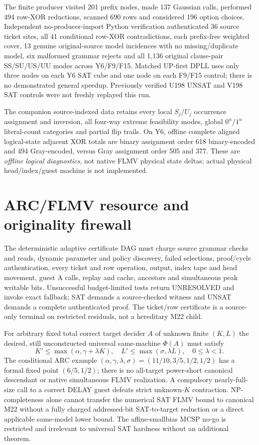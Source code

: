 \documentclass[11pt]{article}
\begin{document}
The finite producer visited 201 prefix nodes, made 137 Gaussian calls, performed 494 row-XOR reductions, scanned 690 rows and considered 196 option choices. Independent no-producer-import Python verification authenticated 36 source ticket sites, all 41 conditional row-XOR contradictions, each prefix-free weighted cover, 13 genuine original-source model incidences with no missing/duplicate model, six malformed grammar rejects and all 1,136 original clause-pair SS/SU/US/UU modes across Y6/F9/F15. Matched UP-first DPLL uses only three nodes on each Y6 SAT cube and one node on each F9/F15 control; there is no demonstrated general speedup. Previously verified U198 UNSAT and V198 SAT controls were not freshly replayed this run.

The companion source-indexed data retains every local $S_j/U_j$ occurrence assignment and inversion, all four-way extreme feasibility modes, global $0^n/1^n$ literal-count categories and partial flip trails. On Y6, offline complete aligned logical-state adjacent XOR totals are binary assignment order 618 binary-encoded and 494 Gray-encoded, versus Gray assignment order 505 and 377. These are \emph{offline logical diagnostics}, not native FLMV physical state deltas; actual physical head/index/guest machine is not implemented.

\section{ARC/FLMV resource and originality firewall}
The deterministic adaptive certificate DAG must charge source grammar checks and reads, dynamic parameter and policy discovery, failed selections, proof/cycle authentication, every ticket and row operation, output, index tape and head movement, guest A calls, replay and cache, ancestors and simultaneous peak writable bits. Unsuccessful budget-limited tests return UNRESOLVED and invoke exact fallback; SAT demands a source-checked witness and UNSAT demands a complete authenticated proof. The ticket/row certificate is a source-only terminal on restricted residuals, not a hereditary M22 child.

For arbitrary fixed total correct target decider $A$ of unknown finite $(K,L)$ the desired, still unconstructed universal same-machine $\Phi(A)$ must satisfy
\[
K'\le\max(\alpha,\gamma+\lambda K),\quad
L'\le\max(\sigma,\lambda L),\quad 0\le\lambda<1.
\]
The conditional ARC example $(\alpha,\gamma,\lambda,\sigma)=(11/10,3/5,1/2,1/2)$ has a formal fixed point $(6/5,1/2)$; there is no all-target power-short canonical descendant or native simultaneous FLMV realization. A compulsory nearly-full-size call to a correct DELAY guest defeats strict unknown-$K$ contraction. NP-completeness alone cannot transfer the numerical SAT FLMV bound to canonical M22 without a fully charged addressed-bit SAT-to-target reduction or a direct applicable same-model lower bound. The affine-smallbias MCSP no-go is restricted and irrelevant to universal SAT hardness without an additional theorem.
\end{document}
